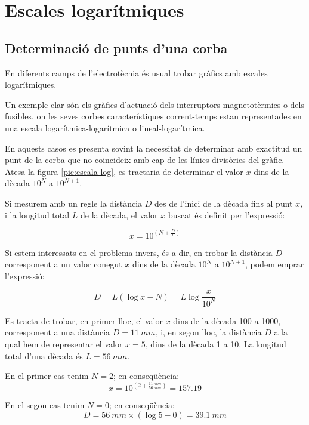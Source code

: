 \section{Escales logarítmiques}\label{sec:escales-log} 

\subsection{Determinació de punts d'una corba}

En diferents camps de l'electrotècnia és usual trobar gràfics amb escales
logarítmiques.

Un exemple clar són els gràfics d'actuació dels interruptors magnetotèrmics o dels
fusibles, on les seves corbes característiques corrent-temps estan representades en
una escala logarítmica-logarítmica o lineal-logarítmica.

En aquests casos es presenta sovint la necessitat de determinar amb exactitud un
punt de la corba que no coincideix amb cap de les línies divisòries del gràfic. Atesa
la figura \vref{pic:escala log}, es tractaria de determinar el valor $x$ dins de la dècada
$10^N$ a $10^{N+1}$.

\begin{center}
    
    \label{pic:escala log}
\end{center}

Si mesurem amb un regle la distància $D$ des de l'inici de la dècada fins al punt $x$, i
la longitud total $L$ de la dècada, el valor $x$ buscat és definit per l'expressió:

\begin{equation}
    x = 10^{\left(N+\frac{D}{L}\right)}
\end{equation}

Si estem interessats en el problema invers, és a dir, en  trobar la distància $D$
corresponent a un valor conegut $x$ dins de la dècada $10^N$ a $10^{N+1}$, podem emprar
l'expressió:

\begin{equation}
    D = L(\log x - N) = L \log\frac{x}{10^N}
\end{equation}

	
\begin{exemple}[\ValorsEscalaLog{}]
	\addcontentsxms{\ValorsEscalaLog}
    Es tracta de trobar, en primer lloc, el valor $x$ dins de la dècada 100 a 1000, corresponent a una
    distància $D=\qty{11}{mm}$, i, en segon lloc, la distància $D$ a la qual hem de representar el valor $x=5$, dins de la
    dècada 1 a 10. La longitud total d'una dècada és $L=\qty{56}{mm}$.

    En el primer cas tenim $N=2$; en conseqüència:
    \[
        x = 10^{\left(2+\frac{\qty{11}{mm}}{\qty{56}{mm}}\right)}= \num{157,19}
    \]

    En el segon cas tenim $N=0$; en conseqüència:
    \[
        D = \qty{56}{mm} \times (\log 5 - 0)  = \qty{39,1}{mm}
    \]

\end{exemple}

